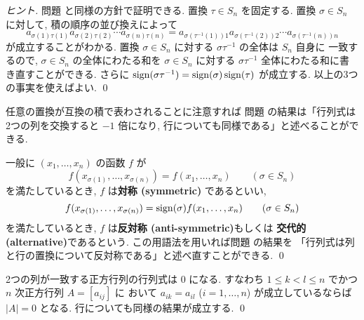 \documentclass[12pt,twoside]{jarticle}
\begin{document}
\begin{proof}[ヒント]
  問題  と同様の方針で証明できる.
  置換 $\tau\in S_n$ を固定する. 
  置換 $\sigma\in S_n$ に対して, 積の順序の並び換えによって
  \begin{equation*}
    a_{\sigma(1)\tau(1)}a_{\sigma(2)\tau(2)}\cdots a_{\sigma(n)\tau(n)}
    =
    a_{\sigma(\tau^{-1}(1))1}a_{\sigma(\tau^{-1}(2))2}\cdots a_{\sigma(\tau^{-1}(n))n}
  \end{equation*}
  が成立することがわかる. 
  置換 $\sigma\in S_n$ に対する $\sigma\tau^{-1}$ の全体は $S_n$ 自身に
  一致するので, $\sigma\in S_n$ の全体にわたる和を $\sigma\in S_n$ 
  に対する $\sigma\tau^{-1}$ 全体にわたる和に書き直すことができる.
  さらに $\mathop{\mathrm{sign}}\nolimits(\sigma\tau^{-1})=\mathop{\mathrm{sign}}\nolimits(\sigma)\mathop{\mathrm{sign}}\nolimits(\tau)$ が成立する.
  以上の3つの事実を使えばよい.
  \qed
\end{proof}

\begin{guide}[行列式の反対称性]
  任意の置換が互換の積で表わされることに注意すれば
  問題  の結果は「行列式は2つの列を交換すると $-1$ 倍になり, 
  行についても同様である」と述べることができる.

  一般に $(x_1,\ldots,x_n)$ の函数 $f$ が
  \begin{equation*}
    f(x_{\sigma(1)},\ldots,x_{\sigma(n)})
    =  f(x_1,\ldots,x_n)
    \qquad (\sigma\in S_n)
  \end{equation*}
  を満たしているとき, $f$ は{\bf 対称 (symmetric)} であるといい,
  \begin{equation*}
    f(x_{\sigma(1)},\ldots,x_{\sigma(n)})
    =  \mathop{\mathrm{sign}}\nolimits(\sigma) f(x_1,\ldots,x_n)
    \qquad (\sigma\in S_n)
  \end{equation*}
  を満たしているとき, $f$ は{\bf 反対称 (anti-symmetric)}もしくは
  {\bf 交代的 (alternative)}であるという.
  この用語法を用いれば問題  の結果を
  「行列式は列と行の置換について反対称である」と述べ直すことができる.
  \qed
\end{guide}


\begin{question}[2つの列や行が一致する場合]
  \label{q:icchi-det}
  2つの列が一致する正方行列の行列式は $0$ になる.
  すなわち $1\le k<l\le n$ でかつ $n$ 次正方行列 $A=[a_{ij}]$ に
  おいて $a_{ik}=a_{il}$ ($i=1,\ldots,n$) が成立しているならば $|A|=0$ 
  となる. 行についても同様の結果が成立する.
  \qed
\end{question}
\end{document}
